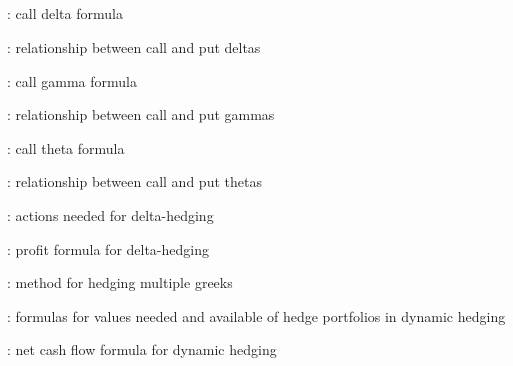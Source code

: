 \subsection*{}
\item {}: call delta formula
\item {}: relationship between call and put deltas
\item {}: call gamma formula
\item {}: relationship between call and put gammas
\item {}: call theta formula
\item {}: relationship between call and put thetas
\item {}: actions needed for delta-hedging
\item {}: profit formula for delta-hedging
\item {}: method for hedging multiple greeks
\item {}: formulas for values needed and available of hedge portfolios in dynamic hedging
\item {}: net cash flow formula for dynamic hedging
